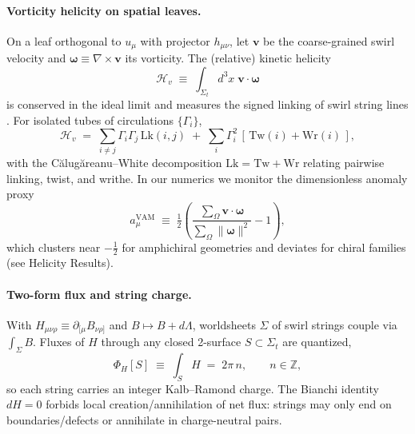 \paragraph{Vorticity helicity on spatial leaves.}
On a leaf orthogonal to \(u_\mu\) with projector \(h_{\mu\nu}\), let \(\mathbf{v}\) be the coarse-grained swirl velocity and \(\boldsymbol{\omega}\equiv\nabla\times\mathbf{v}\) its vorticity. The (relative) kinetic helicity
\begin{equation}
 \mathcal{H}_{\!v} \;\equiv\; \int_{\Sigma_t} d^3x\; \mathbf{v}\cdot\boldsymbol{\omega}
\end{equation}
is conserved in the ideal limit and measures the signed linking of swirl string lines \cite{Moffatt1969,Arnold1998}.
For isolated tubes of circulations \(\{\Gamma_i\}\),
\begin{equation}
 \mathcal{H}_{\!v} \;=\; \sum_{i\neq j} \Gamma_i\Gamma_j\,\mathrm{Lk}(i,j)\;+\;\sum_i \Gamma_i^2\,[\,\mathrm{Tw}(i)+\mathrm{Wr}(i)\,],
 \label{eq:calug}
\end{equation}
with the Călugăreanu--White decomposition \(\mathrm{Lk}=\mathrm{Tw}+\mathrm{Wr}\) relating pairwise linking, twist, and writhe. In our numerics we monitor the dimensionless anomaly proxy
\begin{equation}
    a_\mu^{\mathrm{VAM}} \;\equiv\; \tfrac12\!\left(\frac{\sum_{\Omega}\mathbf{v}\!\cdot\!\boldsymbol{\omega}}{\sum_{\Omega}\|\boldsymbol{\omega}\|^2}-1\right),
\end{equation}
which clusters near \(-\tfrac12\) for amphichiral geometries and deviates for chiral families (see Helicity Results).

\paragraph{Two-form flux and string charge.}
With \(H_{\mu\nu\rho}\equiv\partial_{[\mu}B_{\nu\rho]}\) and \(B\mapsto B+d\Lambda\),
worldsheets \(\Sigma\) of swirl strings couple via \(\int_\Sigma B\).
Fluxes of \(H\) through any closed 2-surface \(S\subset\Sigma_t\) are quantized,
\begin{equation}
    \Phi_H[S] \;\equiv\; \int_S H \;=\; 2\pi\,n,\qquad n\in\mathbb{Z},
\end{equation}
so each string carries an integer Kalb--Ramond charge. The Bianchi identity \(dH=0\) forbids local creation/annihilation of net flux: strings may only end on boundaries/defects or annihilate in charge-neutral pairs.

